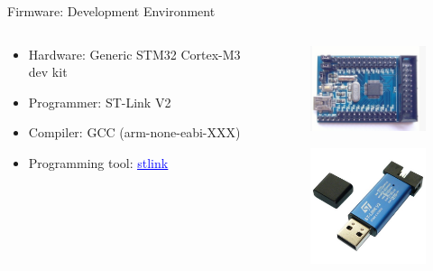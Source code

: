 \begin{frame}{Firmware: Development Environment}

    \begin{columns}[t]
        \begin{column}[t]{0.6\textwidth}
            \begin{itemize}
                \vspace{0.4cm}
                \item Hardware: Generic STM32 Cortex-M3 dev kit
                \vspace{0.4cm}
                \item Programmer: ST-Link V2
                \vspace{0.4cm}
                \item Compiler: GCC (arm-none-eabi-XXX)
                \vspace{0.4cm}
                \item Programming tool: \href{https://github.com/stlink-org/stlink}{\textcolor{blue}{\underline{stlink}}}
            \end{itemize}
        \end{column}
        \begin{column}[t]{0.4\textwidth}
            \begin{figure}[!ht]
                \begin{center}
                    \includegraphics[width=4cm]{figures/stm32-dev-kit}
                \end{center}
            \end{figure}
            \begin{figure}[!ht]
                \begin{center}
                    \includegraphics[width=3.5cm]{figures/stlink-v2}
                \end{center}
            \end{figure}
        \end{column}
    \end{columns}
\end{frame}

